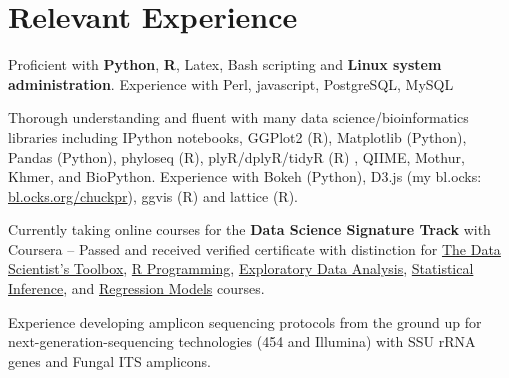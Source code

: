 \documentclass[letterpaper]{article}
\renewenvironment{itemize}{
  \begin{list}{}{
    \setlength{\leftmargin}{1.5em}
  }
}{
  \end{list}
}
\begin{document}
\section*{Relevant Experience}
\begin{itemize}
        {\small
    \item Proficient with \textbf{Python}, \textbf{R}, Latex, Bash
        scripting and \textbf{Linux system administration}. Experience
        with Perl, javascript, PostgreSQL, MySQL
    \item Thorough understanding and fluent with many data
        science/bioinformatics libraries including IPython notebooks,
        GGPlot2 (R), Matplotlib (Python), Pandas (Python), phyloseq
        (R), plyR/dplyR/tidyR (R) , QIIME, Mothur, Khmer, and BioPython.
        Experience with Bokeh (Python), D3.js (my bl.ocks:
        \href{http://bl.ocks.org/chuckpr}{bl.ocks.org/chuckpr}), ggvis
        (R) and lattice (R).
    \item Currently taking online courses for the \textbf{Data Science
        Signature Track} with Coursera -- Passed and received verified
        certificate with distinction for 
        \href{https://www.coursera.org/verify/TVZ2AX26SJ}{The Data Scientist's Toolbox},
        \href{https://www.coursera.org/verify/SB25Y92UJ6}{R Programming}, 
        \href{https://www.coursera.org/account/accomplishments/records/J75Um8uqQcrzBGDg}{Exploratory Data Analysis}, 
        \href{https://www.coursera.org/account/accomplishments/records/TXAWtJZV6hSe2U8G}{Statistical Inference}, and
        \href{https://www.coursera.org/account/accomplishments/records/pTVzUYHgx4sbcUmY}{Regression Models}
        courses.
    \item Experience developing amplicon sequencing protocols from the
        ground up for next-generation-sequencing technologies (454 and
        Illumina) with SSU rRNA genes and Fungal ITS amplicons.
        }
\end{itemize}
\end{document}
